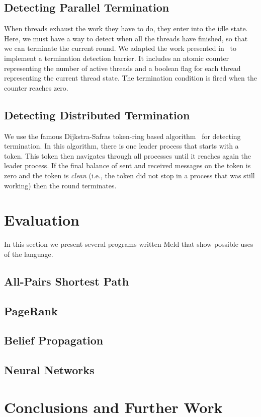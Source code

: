 \documentclass[preprint]{sigplanconf}
\begin{document}
\subsection{Detecting Parallel Termination}

When threads exhaust the work they have to do, they enter into the idle state. Here, we must 
have a way to detect when all the threads have finished, so that we can terminate the current
round. We adapted the work presented in~\cite{Flood:2001:PGC:1267847.1267868} to implement
a termination detection barrier. It includes an atomic counter representing the number
of active threads and a boolean flag for each thread representing the current thread state.
The termination condition is fired when the counter reaches zero.

\subsection{Detecting Distributed Termination}\label{sec:distributedtermination}

We use the famous Dijkstra-Safras token-ring based algorithm~\cite{safras87} for detecting
termination. In this algorithm, there is one leader process that starts with a token. This
token then navigates through all processes until it reaches again the leader process. If
the final balance of sent and received messages on the token is zero and the token is \emph{clean}
(i.e., the token did not stop in a process that was still working) then the round terminates.

\section{Evaluation}\label{sec:evaluation}

In this section we present several programs written Meld that show possible
uses of the language.

\subsection{All-Pairs Shortest Path}

\subsection{PageRank}

\subsection{Belief Propagation}

\subsection{Neural Networks}

\section{Conclusions and Further Work}

\acks






\end{document}
